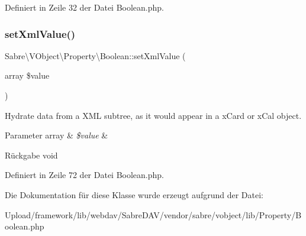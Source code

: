 Definiert in Zeile 32 der Datei Boolean.\+php.

\mbox{\label{class_sabre_1_1_v_object_1_1_property_1_1_boolean_a143e7240c75c5c0a73b1d5af4abc9d19}} 
\subsubsection{\texorpdfstring{set\+Xml\+Value()}{setXmlValue()}}
{\footnotesize\ttfamily Sabre\textbackslash{}\+V\+Object\textbackslash{}\+Property\textbackslash{}\+Boolean\+::set\+Xml\+Value (\begin{DoxyParamCaption}\item[{array}]{\$value }\end{DoxyParamCaption})}

Hydrate data from a X\+ML subtree, as it would appear in a x\+Card or x\+Cal object.


\begin{DoxyParams}[1]{Parameter}
array & {\em \$value} & \\
\hline
\end{DoxyParams}
\begin{DoxyReturn}{Rückgabe}
void 
\end{DoxyReturn}


Definiert in Zeile 72 der Datei Boolean.\+php.



Die Dokumentation für diese Klasse wurde erzeugt aufgrund der Datei\+:\begin{DoxyCompactItemize}
\item 
Upload/framework/lib/webdav/\+Sabre\+D\+A\+V/vendor/sabre/vobject/lib/\+Property/Boolean.\+php\end{DoxyCompactItemize}
